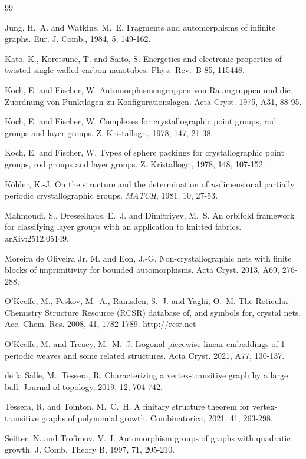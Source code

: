 \documentclass[11pt,a4paper]{article}
\begin{document}
\begin{thebibliography}{99}
\begin{small}
 Jung, H.~A. and Watkins, M.~E. Fragments and automorphisms of infinite graphs. Eur. J. Comb., 1984, 5, 149-162.

 Kato, K., Koretsune, T. and Saito, S. Energetics and electronic properties of twisted single-walled carbon nanotubes. Phys.~Rev.~B 85, 115448.

 Koch, E. and Fischer, W. Automorphismengruppen von Raumgruppen und die Zuordnung von Punktlagen zu Konfigurationslagen. Acta Cryst. 1975, A31, 88-95.

 Koch, E. and Fischer, W. Complexes for crystallographic point groups, rod groups and layer groups. Z. Kristallogr., 1978, 147, 21-38.

 Koch, E. and Fischer, W. Types of sphere packings for crystallographic point groups, rod groups and layer groups. Z. Kristallogr., 1978, 148, 107-152.

 K{\"o}hler, K.-J. On the structure and the determination of $n$-dimensional partially periodic crystallographic groups. \emph{MATCH}, 1981, 10, 27-53.

 Mahmoudi, S., Dresselhaus, E.~J. and Dimitriyev, M.~S. An orbifold framework for classifying layer groups with an application to knitted fabrics. arXiv:2512.05149.

 Moreira de Oliveira Jr, M. and Eon, J.-G. Non-crystallographic nets with finite blocks of imprimitivity for bounded automorphisms.  Acta Cryst. 2013, A69, 276-288.

 O'Keeffe, M., Peskov, M.~A., Ramsden, S.~J. and Yaghi, O.~M. The Reticular Chemistry Structure Resource (RCSR) database of, and symbols for, crystal nets. Acc. Chem. Res. 2008, 41, 1782-1789. http://rcsr.net

 O'Keeffe, M. and Treacy, M.~M.~J. Isogonal piecewise linear embeddings of 1-periodic weaves and some related structures. Acta Cryst. 2021, A77, 130-137.

 de la Salle, M., Tessera, R. Characterizing a vertex-transitive graph by a large ball. Journal of topology, 2019, 12, 704-742.

 Tessera, R. and Tointon, M.~C.~H. A finitary structure theorem for vertex-transitive graphs of polynomial growth. Combinatorica, 2021, 41, 263-298.

 Seifter, N. and Trofimov, V.~I. Automorphism groups of graphs with quadratic growth. J. Comb. Theory B, 1997, 71, 205-210.


\end{small}
\end{thebibliography}
\end{document}
